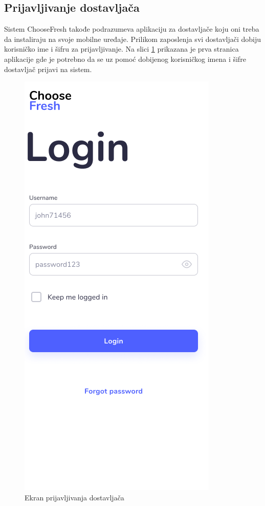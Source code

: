 \subsection{Prijavljivanje dostavljača}


Sistem ChooseFresh takođe podrazumeva aplikaciju za dostavljače koju oni treba da instaliraju na svoje mobilne uređaje. Prilikom zaposlenja svi dostavljači dobiju korisničko ime i šifru za prijavljivanje. Na slici \ref{fig:DeliverymanLogIn} prikazana je prva stranica aplikacije gde je potrebno da se uz pomoć dobijenog korisničkog imena i šifre dostavljač prijavi na sistem.  

\begin{figure}[H]
	\begin{center}
		\includegraphics[scale=0.3]{UI/deliveryman_login.png}
    		\caption{Ekran prijavljivanja dostavljača}
    \label{fig:DeliverymanLogIn}
    \end{center}
\end{figure}